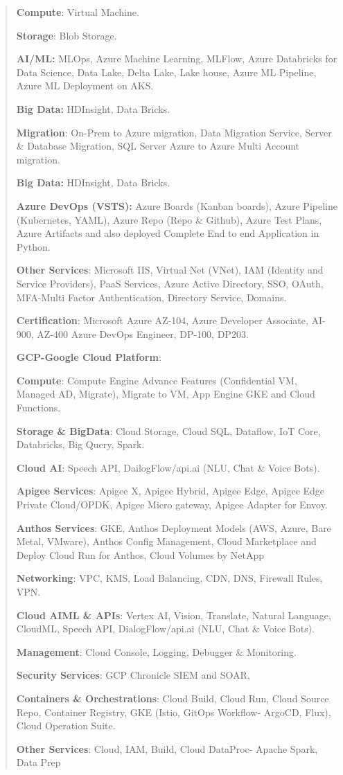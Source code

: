 \documentclass[a4paper]{article}
\begin{document}
\begin{quote}
\textbf{Compute}: Virtual Machine.

\textbf{Storage}: Blob Storage.

\textbf{AI/ML:} MLOps, Azure Machine Learning, MLFlow, Azure Databricks
for Data Science, Data Lake, Delta Lake, Lake house, Azure ML Pipeline,
Azure ML Deployment on AKS.

\textbf{Big Data:} HDInsight, Data Bricks.

\textbf{Migration}: On-Prem to Azure migration, Data Migration Service,
Server \& Database Migration, SQL Server Azure to Azure Multi Account
migration.

\textbf{Big Data:} HDInsight, Data Bricks.

\textbf{Azure DevOps (VSTS):} Azure Boards (Kanban boards), Azure
Pipeline (Kubernetes, YAML), Azure Repo (Repo \& Github), Azure Test
Plans, Azure Artifacts and also deployed Complete End to end Application
in Python.

\textbf{Other Services}: Microsoft IIS, Virtual Net (VNet), IAM
(Identity and Service Providers), PaaS Services, Azure Active Directory,
SSO, OAuth, MFA-Multi Factor Authentication, Directory Service, Domains.

\textbf{Certification}: Microsoft Azure AZ-104, Azure Developer
Associate, AI-900, AZ-400 Azure DevOps Engineer, DP-100, DP203.

\textbf{GCP-Google Cloud Platform}:

\textbf{Compute}: Compute Engine Advance Features (Confidential VM,
Managed AD, Migrate), Migrate to VM, App Engine GKE and Cloud Functions.

\textbf{Storage \& BigData}: Cloud Storage, Cloud SQL, Dataflow, IoT
Core, Databricks, Big Query, Spark.

\textbf{Cloud AI}: Speech API, DailogFlow/api.ai (NLU, Chat \& Voice
Bots).

\textbf{Apigee Services}: Apigee X, Apigee Hybrid, Apigee Edge, Apigee
Edge Private Cloud/OPDK, Apigee Micro gateway, Apigee Adapter for Envoy.

\textbf{Anthos Services}: GKE, Anthos Deployment Models (AWS, Azure,
Bare Metal, VMware), Anthos Config Management, Cloud Marketplace and
Deploy Cloud Run for Anthos, Cloud Volumes by NetApp

\textbf{Networking}: VPC, KMS, Load Balancing, CDN, DNS, Firewall Rules,
VPN.

\textbf{Cloud AIML \& APIs}: Vertex AI, Vision, Translate, Natural
Language, CloudML, Speech API, DialogFlow/api.ai (NLU, Chat \& Voice
Bots).

\textbf{Management}: Cloud Console, Logging, Debugger \& Monitoring.

\textbf{Security Services}: GCP Chronicle SIEM and SOAR,

\textbf{Containers \& Orchestrations}: Cloud Build, Cloud Run, Cloud
Source Repo, Container Registry, GKE (Istio, GitOps Workflow- ArgoCD,
Flux), Cloud Operation Suite.

\textbf{Other Services}: Cloud, IAM, Build, Cloud DataProc- Apache
Spark, Data Prep
\end{quote}
\end{document}
